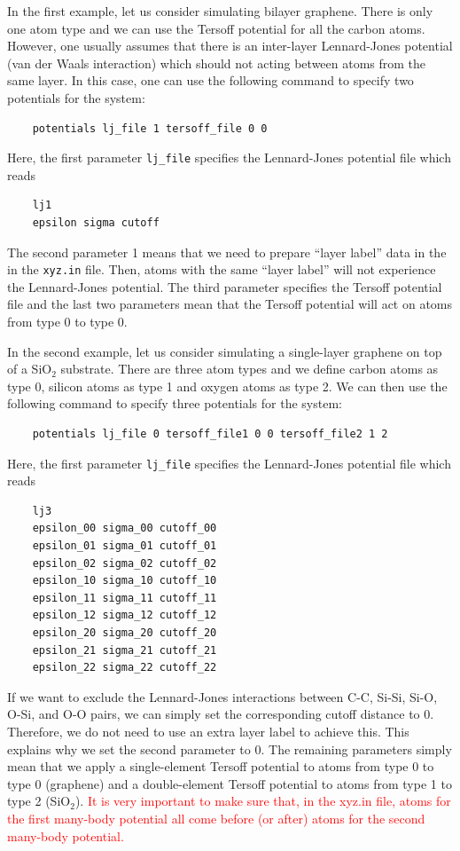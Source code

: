 \documentclass[12pt,a4paper]{report}
\begin{document}
In the first example, let us consider simulating bilayer graphene. There is only one atom type and we can use the Tersoff potential for all the carbon atoms. However, one usually assumes that there is an inter-layer Lennard-Jones potential (van der Waals interaction) which should not acting between atoms from the same layer. In this case, one can use the following command to specify two potentials for the system:
\begin{verbatim}
    potentials lj_file 1 tersoff_file 0 0
\end{verbatim}
Here,  the first parameter \verb"lj_file" specifies the Lennard-Jones potential file which reads 
\begin{verbatim}
    lj1
    epsilon sigma cutoff
\end{verbatim}
The second parameter 1 means that we need to prepare ``layer label'' data in the  in the  \verb"xyz.in" file. Then, atoms with the same ``layer label'' will not experience the Lennard-Jones potential. The third parameter specifies the Tersoff potential file and the last two parameters mean that the Tersoff potential will act on atoms from type 0 to type 0.


In the second example, let us consider simulating a single-layer graphene on top of a SiO$_2$ substrate. There are three atom types and we define carbon atoms as type 0, silicon atoms as type 1 and oxygen atoms as type 2. We can then use the following command to specify three potentials for the system:
\begin{verbatim}
    potentials lj_file 0 tersoff_file1 0 0 tersoff_file2 1 2
\end{verbatim}
Here,  the first parameter \verb"lj_file" specifies the Lennard-Jones potential file which reads 
\begin{verbatim}
    lj3
    epsilon_00 sigma_00 cutoff_00
    epsilon_01 sigma_01 cutoff_01
    epsilon_02 sigma_02 cutoff_02
    epsilon_10 sigma_10 cutoff_10
    epsilon_11 sigma_11 cutoff_11
    epsilon_12 sigma_12 cutoff_12
    epsilon_20 sigma_20 cutoff_20
    epsilon_21 sigma_21 cutoff_21
    epsilon_22 sigma_22 cutoff_22
\end{verbatim}
If we want to exclude the Lennard-Jones interactions between C-C, Si-Si, Si-O, O-Si, and O-O pairs, we can simply set the corresponding cutoff distance to 0. Therefore, we do not need to use an extra layer label to achieve this. This explains why we set the second parameter to 0. The remaining parameters simply mean that we apply a single-element Tersoff potential to atoms from type 0 to type 0 (graphene) and a double-element Tersoff potential to atoms from type 1 to type 2 (SiO$_2$). \textcolor{red}{It is very important to make sure that, in the xyz.in file, atoms for the first many-body potential all come before (or after) atoms for the second many-body potential.}
\end{document}

